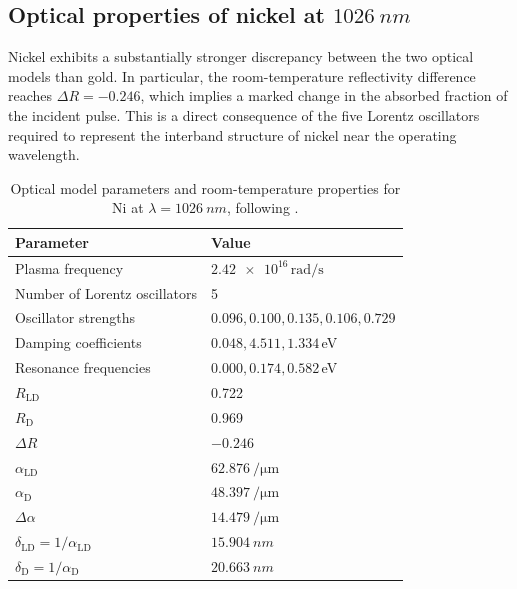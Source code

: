 \subsection{Optical properties of nickel at \texorpdfstring{\(\SI{1026}{nm}\)}{1026 nm}}
\label{sec:ch3-optical-ni}

Nickel exhibits a substantially stronger discrepancy between the two
optical models than gold. In particular, the room-temperature
reflectivity difference reaches \(\Delta R = -0.246\), which implies a
marked change in the absorbed fraction of the incident pulse. This is a
direct consequence of the five Lorentz oscillators required to represent
the interband structure of nickel near the operating wavelength.

\begin{table}[htbp]
    \centering
    \caption{Optical model parameters and room-temperature properties for Ni at \(\lambda = \SI{1026}{nm}\), following \cite{Tsibidis_2018,Lin_2008,Chen_2010}.}
    \label{tab:ch3-ni-optical}
    \begin{tabular}{@{}ll@{}}
        \toprule
        \rowcolor{gray!20}
        \textbf{Parameter}                                & \textbf{Value}                             \\
        \midrule
        Plasma frequency                                  & \(\num{2.42e16}\,\si{\radian\per\second}\) \\
        Number of Lorentz oscillators                     & 5                                          \\
        Oscillator strengths                              & \(0.096, 0.100, 0.135, 0.106, 0.729\)      \\
        Damping coefficients                              & \(0.048, 4.511, 1.334\)\,eV                \\
        Resonance frequencies                             & \(0.000, 0.174, 0.582\)\,eV                \\
        \(R_{\mathrm{LD}}\)                               & 0.722                                      \\
        \(R_{\mathrm{D}}\)                                & 0.969                                      \\
        \(\Delta R\)                                      & \(-0.246\)                                 \\
        \(\alpha_{\mathrm{LD}}\)                          & \(\SI{62.876}{\per\micro\metre}\)          \\
        \(\alpha_{\mathrm{D}}\)                           & \(\SI{48.397}{\per\micro\metre}\)          \\
        \(\Delta \alpha\)                                 & \(\SI{14.479}{\per\micro\metre}\)          \\
        \(\delta_{\mathrm{LD}} = 1/\alpha_{\mathrm{LD}}\) & \(\SI{15.904}{nm}\)                        \\
        \(\delta_{\mathrm{D}} = 1/\alpha_{\mathrm{D}}\)   & \(\SI{20.663}{nm}\)                        \\
        \bottomrule
    \end{tabular}
\end{table}

